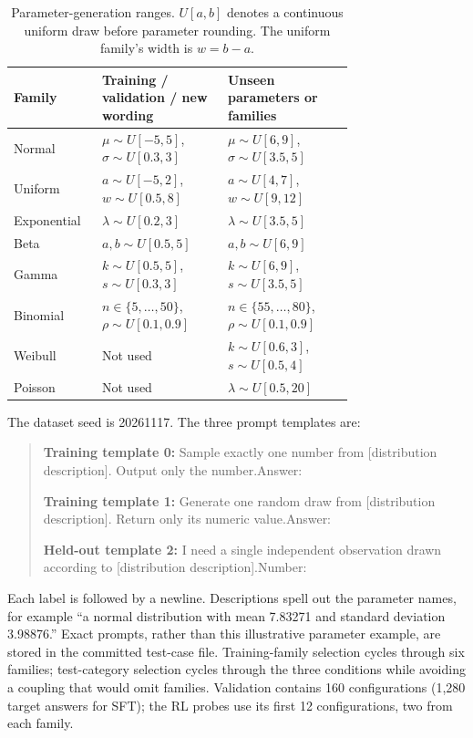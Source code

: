\begin{table}[htbp]
\centering\small
\caption{Parameter-generation ranges. $U[a,b]$ denotes a continuous uniform
draw before parameter rounding. The uniform family's width is $w=b-a$.}
\label{tab:ranges}
\begin{tabular}{@{}lp{0.37\linewidth}p{0.37\linewidth}@{}}
\toprule
Family & Training / validation / new wording & Unseen parameters or families\\
\midrule
Normal & $\mu\sim U[-5,5]$, $\sigma\sim U[0.3,3]$ &
 $\mu\sim U[6,9]$, $\sigma\sim U[3.5,5]$\\
Uniform & $a\sim U[-5,2]$, $w\sim U[0.5,8]$ &
 $a\sim U[4,7]$, $w\sim U[9,12]$\\
Exponential & $\lambda\sim U[0.2,3]$ & $\lambda\sim U[3.5,5]$\\
Beta & $a,b\sim U[0.5,5]$ & $a,b\sim U[6,9]$\\
Gamma & $k\sim U[0.5,5]$, $s\sim U[0.3,3]$ &
 $k\sim U[6,9]$, $s\sim U[3.5,5]$\\
Binomial & $n\in\{5,\ldots,50\}$, $\rho\sim U[0.1,0.9]$ &
 $n\in\{55,\ldots,80\}$, $\rho\sim U[0.1,0.9]$\\
Weibull & Not used & $k\sim U[0.6,3]$, $s\sim U[0.5,4]$\\
Poisson & Not used & $\lambda\sim U[0.5,20]$\\
\bottomrule
\end{tabular}
\end{table}

The dataset seed is 20261117. The three prompt templates are:
\par\noindent\begin{minipage}{\linewidth}
\begin{quote}\small
\textbf{Training template 0:} Sample exactly one number from [distribution
description]. Output only the number.\newline Answer:\par
\textbf{Training template 1:} Generate one random draw from [distribution
description]. Return only its numeric value.\newline Answer:\par
\textbf{Held-out template 2:} I need a single independent observation drawn
according to [distribution description].\newline Number:
\end{quote}
\end{minipage}\par
Each label is followed by a newline. Descriptions spell out the parameter
names, for example ``a normal distribution with mean 7.83271 and standard
deviation 3.98876.'' Exact prompts, rather than this illustrative parameter
example, are stored in the committed test-case file. Training-family
selection cycles through six families; test-category selection cycles
through the three conditions while avoiding a coupling that would omit
families. Validation contains 160 configurations (1,280 target answers for
SFT); the RL probes use its first 12 configurations, two from each family.

